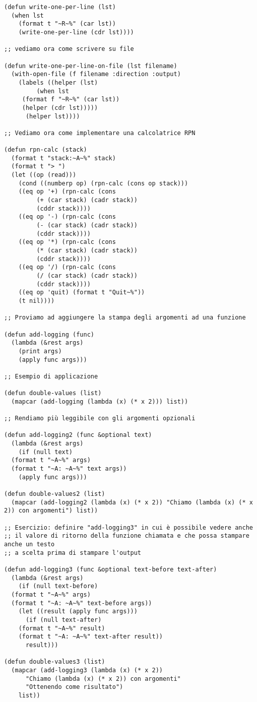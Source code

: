 \documentclass[a4paper,12pt, oneside]{book}
\begin{document}
\begin{verbatim}
(defun write-one-per-line (lst)
  (when lst
    (format t "~R~%" (car lst))
    (write-one-per-line (cdr lst))))
  
;; vediamo ora come scrivere su file

(defun write-one-per-line-on-file (lst filename)
  (with-open-file (f filename :direction :output)
    (labels ((helper (lst)
         (when lst
     (format f "~R~%" (car lst))
     (helper (cdr lst)))))
      (helper lst))))
         
;; Vediamo ora come implementare una calcolatrice RPN

(defun rpn-calc (stack)
  (format t "stack:~A~%" stack)
  (format t "> ")
  (let ((op (read)))
    (cond ((numberp op) (rpn-calc (cons op stack)))
    ((eq op '+) (rpn-calc (cons
         (+ (car stack) (cadr stack))
         (cddr stack))))
    ((eq op '-) (rpn-calc (cons
         (- (car stack) (cadr stack))
         (cddr stack))))
    ((eq op '*) (rpn-calc (cons
         (* (car stack) (cadr stack))
         (cddr stack))))
    ((eq op '/) (rpn-calc (cons
         (/ (car stack) (cadr stack))
         (cddr stack))))
    ((eq op 'quit) (format t "Quit~%"))
    (t nil))))

;; Proviamo ad aggiungere la stampa degli argomenti ad una funzione

(defun add-logging (func)
  (lambda (&rest args)
    (print args)
    (apply func args)))

;; Esempio di applicazione

(defun double-values (list)
  (mapcar (add-logging (lambda (x) (* x 2))) list))

;; Rendiamo più leggibile con gli argomenti opzionali

(defun add-logging2 (func &optional text)
  (lambda (&rest args)
    (if (null text)
  (format t "~A~%" args)
  (format t "~A: ~A~%" text args))
    (apply func args)))

(defun double-values2 (list)
  (mapcar (add-logging2 (lambda (x) (* x 2)) "Chiamo (lambda (x) (* x 2)) con argomenti") list))

;; Esercizio: definire "add-logging3" in cui è possibile vedere anche
;; il valore di ritorno della funzione chiamata e che possa stampare anche un testo
;; a scelta prima di stampare l'output

(defun add-logging3 (func &optional text-before text-after)
  (lambda (&rest args)
    (if (null text-before)
  (format t "~A~%" args)
  (format t "~A: ~A~%" text-before args))
    (let ((result (apply func args)))
      (if (null text-after)
    (format t "~A~%" result)
    (format t "~A: ~A~%" text-after result))
      result)))

(defun double-values3 (list)
  (mapcar (add-logging3 (lambda (x) (* x 2))
      "Chiamo (lambda (x) (* x 2)) con argomenti"
      "Ottenendo come risultato")
    list))
\end{verbatim}
\end{document}
